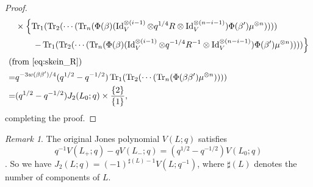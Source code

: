 \documentclass{amsart}
\newcommand{\Id}{\operatorname{Id}}
\newcommand{\Tr}{\operatorname{Tr}}
\theoremstyle{definition}
\theoremstyle{remark}
\newtheorem{remark}[theorem]{Remark}
\numberwithin{equation}{section}
\begin{document}
\begin{proof}
\begin{equation*}
\begin{split}
  &\times
  \left\{
    \Tr_1(\Tr_2(\cdots(\Tr_n(
    \Phi(\beta)
    (\Id_V^{\otimes(i-1)}\otimes q^{1/4}R\otimes\Id_V^{\otimes(n-i-1)})
    \Phi(\beta')
    \mu^{\otimes n}))))
  \right.
  \\
  &\left.
  \qquad
    -
    \Tr_1(\Tr_2(\cdots(\Tr_n(
    \Phi(\beta)
    (\Id_V^{\otimes(i-1)}\otimes q^{-1/4}R^{-1}\otimes\Id_V^{\otimes(n-i-1)})
    \Phi(\beta')\mu^{\otimes n}))))
  \right\}
  \\
  \intertext{(from \eqref{eq:skein_R})}
  =&
  q^{-3w(\beta\beta')/4}
  (q^{1/2}-q^{-1/2})
  \Tr_1(\Tr_2(\cdots(\Tr_n(\Phi(\beta\beta')\mu^{\otimes n}))))
  \\
  =&
  (q^{1/2}-q^{-1/2})J_2(L_0;q)\times\frac{\{2\}}{\{1\}},
\end{split}
\end{equation*}
completing the proof.
\end{proof}
\begin{remark}
The original Jones polynomial $V(L;q)$ satisfies
\begin{equation*}
  q^{-1}V(L_+;q)-qV(L_-;q)
  =
  (q^{1/2}-q^{-1/2})V(L_0;q)
\end{equation*}
\cite[Theorem~12]{Jones:BULAM385}.
So we have $J_2(L;q)=(-1)^{\sharp(L)-1}V(L;q^{-1})$, where $\sharp(L)$ denotes the number of components of $L$.
\end{remark}
\end{document}
